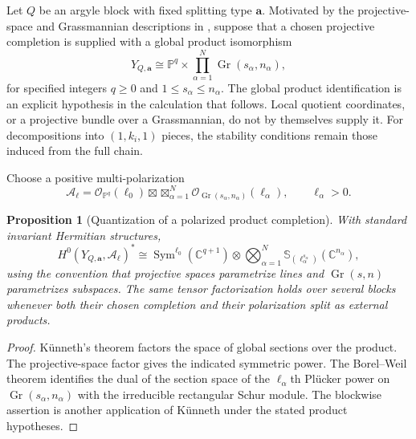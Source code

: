 \documentclass[11pt]{article}
\newtheorem{proposition}[theorem]{Proposition}
\theoremstyle{definition}
\theoremstyle{remark}
\newcommand{\C}{\mathbb C}
\newcommand{\Pp}{\mathbb P}
\newcommand{\cO}{\mathcal O}
\newcommand{\Sym}{\operatorname{Sym}}
\newcommand{\Gr}{\operatorname{Gr}}
\begin{document}
Let $Q$ be an argyle block with fixed splitting type $\boldsymbol a$.  Motivated by the projective-space and Grassmannian descriptions in \cite[arXiv version, Theorems~4.1--4.2]{RayanSundboArgyle2018}, suppose that a chosen projective completion is supplied with a global product isomorphism
\begin{equation}\label{eq:argyle-product}
 Y_{Q,\boldsymbol a}
 \cong
 \Pp^q\times\prod_{\alpha=1}^N\Gr(s_\alpha,n_\alpha),
\end{equation}
for specified integers $q\geq0$ and $1\leq s_\alpha\leq n_\alpha$.  The global product identification is an explicit hypothesis in the calculation that follows.  Local quotient coordinates, or a projective bundle over a Grassmannian, do not by themselves supply it.  For decompositions into $(1,k_i,1)$ pieces, the stability conditions remain those induced from the full chain.

Choose a positive multi-polarization
\begin{equation}\label{eq:argyle-polarization}
 \mathscr A_{\boldsymbol\ell}
 =\cO_{\Pp^q}(\ell_0)
 \boxtimes
 \mathop{\boxtimes}_{\alpha=1}^N
 \cO_{\Gr(s_\alpha,n_\alpha)}(\ell_\alpha),
 \qquad \ell_\alpha>0.
\end{equation}

\begin{proposition}[Quantization of a polarized product completion]\label{prop:argyle-quantization}
With standard invariant Hermitian structures,
\begin{equation}\label{eq:argyle-quantization}
 H^0(Y_{Q,\boldsymbol a},\mathscr A_{\boldsymbol\ell})^*
 \cong
 \Sym^{\ell_0}(\C^{q+1})
 \otimes
 \bigotimes_{\alpha=1}^N
 \mathbb S_{(\ell_\alpha^{s_\alpha})}(\C^{n_\alpha}),
\end{equation}
using the convention that projective spaces parametrize lines and $\Gr(s,n)$ parametrizes subspaces.  The same tensor factorization holds over several blocks whenever both their chosen completion and their polarization split as external products.
\end{proposition}

\begin{proof}
K\"unneth's theorem factors the space of global sections over the product.  The projective-space factor gives the indicated symmetric power.  The Borel--Weil theorem \cite{FultonHarris1991} identifies the dual of the section space of the $\ell_\alpha$th Pl\"ucker power on $\Gr(s_\alpha,n_\alpha)$ with the irreducible rectangular Schur module.  The blockwise assertion is another application of K\"unneth under the stated product hypotheses.
\end{proof}
\end{document}
